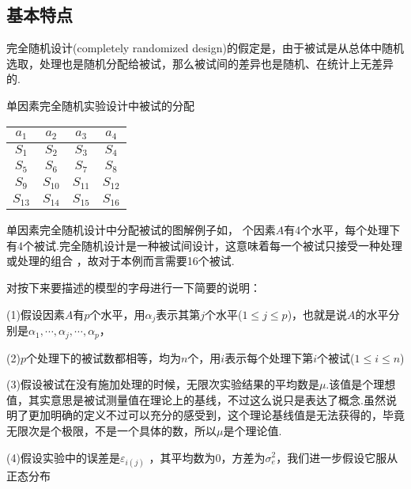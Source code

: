\subsection{基本特点}

完全随机设计(completely randomized design)的假定是，由于被试是从总体中随机选取，处理也是随机分配给被试，那么被试间的差异也是随机、在统计上无差异的.

\begin{margintable}
	\centering
	\caption{单因素完全随机实验设计中被试的分配}
	{
		\begin{tabular}{cccc}
			\toprule
			$a_1$ & $a_2$ & $a_3$ & $a_4$ \\
			\midrule
			$S_1$ & $S_2$ & $S_3$ & $S_4$ \\
			$S_5$ & $S_6$ & $S_7$ & $S_8$ \\
			$S_9$ & $S_{10}$ & $S_{11}$ & $S_{12}$ \\
			$S_{13}$ & $S_{14}$ & $S_{15}$ & $S_{16}$ \\
			\bottomrule
		\end{tabular}
	}
\end{margintable}

单因素完全随机设计中分配被试的图解例子如，
个因素$A$有4个水平，每个处理下有4个被试.完全随机设计是一种被试间设计，这意味着每一个被试只接受一种处理或处理的组合
，故对于本例而言需要16个被试.

对按下来要描述的模型的字母进行一下简要的说明：

(1)假设因素$A$有$p$个水平，用$\alpha _j$表示其第$j$个水平($1 \leq j \leq p$)，也就是说$A$的水平分别是$\alpha _1,\cdots,\alpha _j,\cdots, \alpha _p$，

(2)$p$个处理下的被试数都相等，均为$n$个，用$i$表示每个处理下第$i$个被试($1 \leq i \leq n$)

(3)假设被试在没有施加处理的时候，无限次实验结果的平均数是$\mu$.该值是个理想值，其实意思是被试测量值在理论上的基线，不过这么说只是表达了概念.虽然说明了更加明确的定义不过可以充分的感受到，这个理论基线值是无法获得的，毕竟无限次是个极限，不是一个具体的数，所以$\mu$是个理论值.

(4)假设实验中的误差是$\varepsilon _{i\left(j\right)}$
，其平均数为0，方差为$\sigma _e^2$，我们进一步假设它服从正态分布

